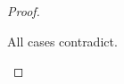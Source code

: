 \begin{proof}
\begin{itemize}
\begin{enumerate}
\begin{enumerate}
    \end{enumerate}

  \end{enumerate}

  All cases contradict.

\end{itemize}

\end{proof}


